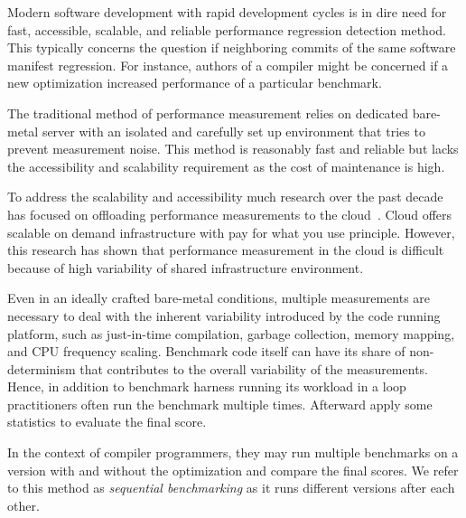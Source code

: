 
Modern software development with rapid development cycles is in dire need for fast, accessible, scalable, and reliable performance regression detection method.
This typically concerns the question if neighboring commits of the same software manifest regression.
For instance, authors of a compiler might be concerned if a new optimization increased performance of a particular benchmark.

The traditional method of performance measurement relies on dedicated bare-metal server with an isolated and carefully set up environment that tries to prevent measurement noise.
This method is reasonably fast and reliable but lacks the accessibility and scalability requirement as the cost of maintenance is high.

To address the scalability and accessibility much research over the past decade has focused on offloading performance measurements to the cloud~\cite{leitner2016patterns, laaber2019software, abedi2017conducting}.
Cloud offers scalable on demand infrastructure with pay for what you use principle.
However, this research has shown that performance measurement in the cloud is difficult because of high variability of shared infrastructure environment.

Even in an ideally crafted bare-metal conditions, multiple measurements are necessary to deal with the inherent variability introduced by the code running platform, such as just-in-time compilation, garbage collection, memory mapping, and CPU frequency scaling.
Benchmark code itself can have its share of non-determinism that contributes to the overall variability of the measurements.
Hence, in addition to benchmark harness running its workload in a loop practitioners often run the benchmark multiple times.
Afterward apply some statistics to evaluate the final score.

In the context of compiler programmers, they may run multiple benchmarks on a version with and without the optimization and compare the final scores.
We refer to this method as \emph{sequential benchmarking} as it runs different versions after each other.

